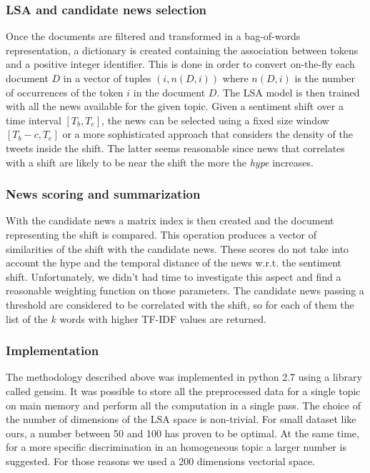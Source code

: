 \subsubsection*{LSA and candidate news selection}
Once the documents are filtered and transformed in a bag-of-words representation, a dictionary is created containing the association between tokens and a positive integer identifier. This is done in order to convert on-the-fly each document $D$ in a vector of tuples $(i,n(D,i))$ where $n(D,i)$ is the number of occurrences of the token $i$ in the document $D$. The LSA model is then trained with all the news available for the given topic. Given a sentiment shift over a time interval $[T_b,T_e]$, the news can be selected using a fixed size window $[T_b - c,T_e]$ or a more sophisticated approach that considers the density of the tweets inside the shift. The latter seems reasonable since news that correlates with a shift are likely to be near the shift the more the \emph{hype} increases.

\subsubsection*{News scoring and summarization}
With the candidate news a matrix index is then created and the document representing the shift is compared. This operation produces a vector of similarities of the shift with the candidate news. These scores do not take into account the hype and the temporal distance of the news w.r.t. the sentiment shift. Unfortunately, we didn't had time to investigate this aspect and find a reasonable weighting function on those parameters. The candidate news passing a threshold are considered to be correlated with the shift, so for each of them the list of the $k$ words with higher TF-IDF values are returned.

\subsubsection*{Implementation}
The methodology described above was implemented in python 2.7 using a library called gensim\cite{Gensim}. It was possible to store all the preprocessed data for a single topic on main memory and perform all the computation in a single pass. The choice of the number of dimensions of the LSA space is non-trivial. For small dataset like ours, a number between 50 and 100 has proven to be optimal\cite{LSA2}. At the same time, for a more specific discrimination in an homogeneous topic a larger number is suggested. For those reasons we used a 200 dimensions vectorial space.
